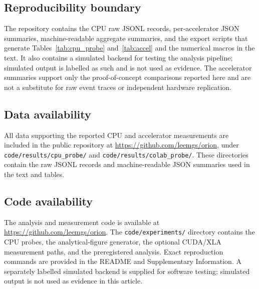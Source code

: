 \subsection*{Reproducibility boundary}

The repository contains the CPU raw JSONL records, per-accelerator JSON
summaries, machine-readable aggregate summaries, and the export scripts that
generate Tables~\ref{tab:cpu_probe} and~\ref{tab:accel} and the numerical
macros in the text. It also contains a simulated backend for testing the
analysis pipeline; simulated output is labelled as such and is not used as
evidence. The accelerator summaries support only the proof-of-concept
comparisons reported here and are not a substitute for raw event traces or
independent hardware replication.

\subsection*{Data availability}
All data supporting the reported CPU and accelerator measurements are included
in the public repository at \url{https://github.com/leemgs/orion}, under
\texttt{code/results/cpu\_probe/} and \texttt{code/results/colab\_probe/}. These
directories contain the raw JSONL records and machine-readable JSON summaries
used in the text and tables.

\subsection*{Code availability}
The analysis and measurement code is available at
\url{https://github.com/leemgs/orion}. The \texttt{code/experiments/} directory
contains the CPU probes, the analytical-figure generator, the optional
CUDA/XLA measurement paths, and the preregistered analysis. Exact reproduction
commands are provided in the README and Supplementary Information. A separately
labelled simulated backend is supplied for software testing; simulated output
is not used as evidence in this article.

